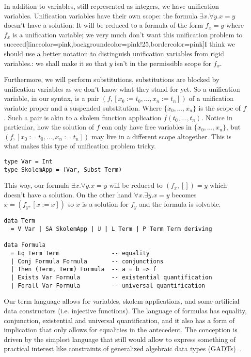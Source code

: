 \documentclass[sigconf, anonymous, review]{acmart}
\newcommand{\improvement}[1]{\todo[linecolor=pink,backgroundcolor=pink!25,bordercolor=pink]{#1}}
\renewcommand{\todo}{}
\newcommand{\improvement}[1]{{}}
\begin{document}
In addition to variables, still represented as integers, we have unification
variables. Unification variables have their own scope: the formula
$\exists x. \forall y. x=y$ doesn't have a solution. It will be reduced to a
formula of the form $f_{x} = y$ where $f_{x}$ is a unification variable; we very much
don't want this unification problem to succeed\improvement{I think we should
  use a better notation to distinguish unification variables from rigid
  variables.}: we shall make it so that $y$ isn't in the permissible scope for $f_{x}$.

Furthermore, we will perform substitutions, substitutions are blocked by
unification variables as we don't know what they stand for yet. So a unification
variable, in our syntax, is a pair $(f, [x_0:=t_0,\ldots,x_n:=t_n])$ of a
unification variable proper and a suspended substitution. Where
$\{x_0,\ldots,x_{n}\}$ is the scope of $f$. Such a pair is akin to a skolem
function application $f(t_0,\ldots,t_n)$. Notice in particular, how the solution
of $f$ can only have free variables in $\{x_0,\ldots,x_{n}\}$, but
$(f, [x_0:=t_0,\ldots,x_n:=t_n])$ may live in a different scope altogether. This
is what makes this type of unification problem tricky.

\begin{verbatim}
type Var = Int
type SkolemApp = (Var, Subst Term)
\end{verbatim}

This way, our formula $\exists x. \forall y. x=y$ will be reduced to
$(f_{x},[]) = y$ which doesn't have a solution. On the other hand
$\forall x. \exists y. x = y$ becomes $x = (f_{y}, [x:=x])$ so $x$ is a solution
for $f_{y}$ and the formula is solvable.

\begin{verbatim}
data Term
  = V Var | SA SkolemApp | U | L Term | P Term Term deriving

data Formula
  = Eq Term Term               -- equality
  | Conj Formula Formula       -- conjunctions
  | Then (Term, Term) Formula  -- a = b => f
  | Exists Var Formula         -- existential quantification
  | Forall Var Formula         -- universal quantification
\end{verbatim}

Our term language allows for variables, skolem applications, and some artificial
data constructors (i.e. injective functions). The language of formulas has
equality, conjunction, existential and universal quantification, and it also
has a form of implication that only allows for equalities in the antecedent.
The conception is driven by the simplest language that still would allow to
express something of practical interest like constraints of generalized
algebraic data types (GADTs)~\cite{schrijvers09}.
\end{document}

